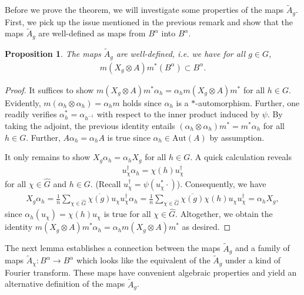 \documentclass{amsart}
\newtheorem{proposition}[thm]{Proposition}
\theoremstyle{definition}
\theoremstyle{definition}
\begin{document}
Before we prove the theorem, we will investigate some properties of the maps $\tilde{A}_g$. First, we pick up the issue mentioned in the previous remark and show that the maps $\tilde{A}_g$ are well-defined as maps from $B^\alpha$ into $B^\alpha$.

\begin{proposition}
    \label{prop:Ag_well_defined}
    The maps $\tilde{A}_g$ are well-defined, i.e. we have for all $g \in G$,
    \begin{align*}
        m(X_g \otimes A) m^\ast(B^\alpha) \subset B^\alpha.
    \end{align*}
\end{proposition}

\begin{proof}
    It suffices to show $m(X_g \otimes A)m^\ast \alpha_h = \alpha_h m(X_g \otimes A)m^\ast$ for all $h \in G$. Evidently, $m(\alpha_h \otimes \alpha_h) = \alpha_h m$ holds since $\alpha_h$ is a $\ast$-automorphism. Further, one readily verifies $\alpha_h^\ast = \alpha_{h^{-1}}$ with respect to the inner product induced by $\psi$. By taking the adjoint, the previous identity entails $(\alpha_h \otimes \alpha_h) m^\ast = m^\ast \alpha_h$ for all $h \in G$. 
    Further, $A \alpha_h = \alpha_h A$ is true since $\alpha_h \in \mathrm{Aut}(A)$ by assumption.

    It only remains to show $X_g \alpha_h = \alpha_h X_g$ for all $h \in G$.
    A quick calculation reveals
    \begin{align*}
        u_\chi^\dagger \alpha_h = \chi(h) u_\chi^\dagger
    \end{align*}
    for all $\chi \in \hat{G}$ and $h \in G$. (Recall $u_\chi^\dagger = \psi(u_\chi^\ast \cdot)$). Consequently, we have
    \begin{align*}
        X_g \alpha_h 
            = \frac{1}{n} \sum_{\chi \in \hat{G}} \overline{\chi(g)} u_\chi u_\chi^\dagger \alpha_h
            = \frac{1}{n} \sum_{\chi \in \hat{G}} \overline{\chi(g)} \chi(h) u_\chi u_\chi^\dagger
            = \alpha_h X_g,
    \end{align*}
    since $\alpha_h(u_\chi) = \chi(h) u_\chi$ is true for all $\chi \in \hat{G}$.
    Altogether, we obtain the identity $m(X_g \otimes A)m^\ast \alpha_h = \alpha_h m(X_g \otimes A)m^\ast$ as desired.
\end{proof}

The next lemma establishes a connection between the maps $\tilde{A}_g$ and a family of maps $\tilde{A}_\chi: B^\alpha \to B^\alpha$ which looks like the equivalent of the $\tilde{A}_g$ under a kind of Fourier transform. These maps have convenient algebraic properties and yield an alternative definition of the maps $\tilde{A}_g$.
\end{document}
